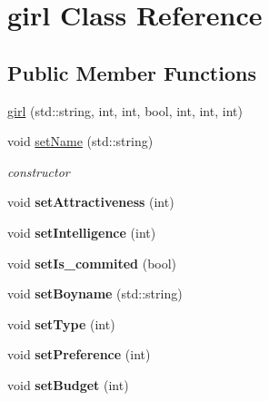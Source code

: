 \hypertarget{classgirl}{}\section{girl Class Reference}
\label{classgirl}
\subsection*{Public Member Functions}
\begin{DoxyCompactItemize}
\item 
\hyperlink{classgirl_a583ce9589214531dc92c46e9d0eebc75}{girl} (std\+::string, int, int, bool, int, int, int)
\item 
\mbox{\label{classgirl_acbf8f5cee4f0cf24df3c96fc43666b43}} 
void \hyperlink{classgirl_acbf8f5cee4f0cf24df3c96fc43666b43}{set\+Name} (std\+::string)
\begin{DoxyCompactList}\small\item\em constructor \end{DoxyCompactList}\item 
\mbox{\label{classgirl_a631115234a7e2ca7b497856e32c4ee7b}} 
void {\bfseries set\+Attractiveness} (int)
\item 
\mbox{\label{classgirl_a3a4c341525032ef1a9a43572ab4ab370}} 
void {\bfseries set\+Intelligence} (int)
\item 
\mbox{\label{classgirl_aa02816fb19d2f81683b5fe75729eacb1}} 
void {\bfseries set\+Is\+\_\+commited} (bool)
\item 
\mbox{\label{classgirl_a761660d73115bf5940576daab5719aff}} 
void {\bfseries set\+Boyname} (std\+::string)
\item 
\mbox{\label{classgirl_a85b694210361853ec1fee3f232491009}} 
void {\bfseries set\+Type} (int)
\item 
\mbox{\label{classgirl_afdd10cabb120b9bbc44c8c243168baf3}} 
void {\bfseries set\+Preference} (int)
\item 
\mbox{\label{classgirl_aabb69c46aef35ff020d90d3b28300f98}} 
void {\bfseries set\+Budget} (int)
\item 
\mbox{\label{classgirl_ae0499077a33b4a517867f431bccfe93a}} 

\end{DoxyCompactItemize}
